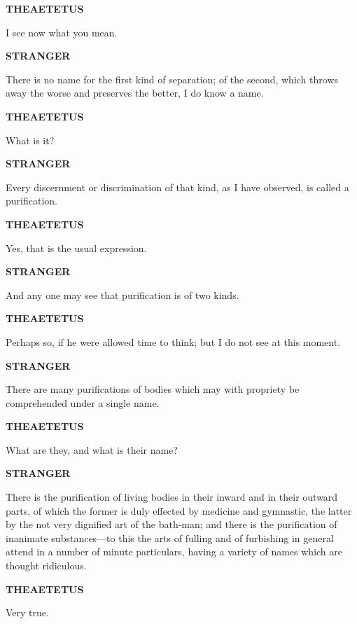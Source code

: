\documentclass[11pt,letter]{article}
\begin{document}
\par \textbf{THEAETETUS}
\par   I see now what you mean.

\par \textbf{STRANGER}
\par   There is no name for the first kind of separation; of the second, which throws away the worse and preserves the better, I do know a name.

\par \textbf{THEAETETUS}
\par   What is it?

\par \textbf{STRANGER}
\par   Every discernment or discrimination of that kind, as I have observed, is called a purification.

\par \textbf{THEAETETUS}
\par   Yes, that is the usual expression.

\par \textbf{STRANGER}
\par   And any one may see that purification is of two kinds.

\par \textbf{THEAETETUS}
\par   Perhaps so, if he were allowed time to think; but I do not see at this moment.

\par \textbf{STRANGER}
\par   There are many purifications of bodies which may with propriety be comprehended under a single name.

\par \textbf{THEAETETUS}
\par   What are they, and what is their name?

\par \textbf{STRANGER}
\par   There is the purification of living bodies in their inward and in their outward parts, of which the former is duly effected by medicine and gymnastic, the latter by the not very dignified art of the bath-man; and there is the purification of inanimate substances—to this the arts of fulling and of furbishing in general attend in a number of minute particulars, having a variety of names which are thought ridiculous.

\par \textbf{THEAETETUS}
\par   Very true.
\end{document}
